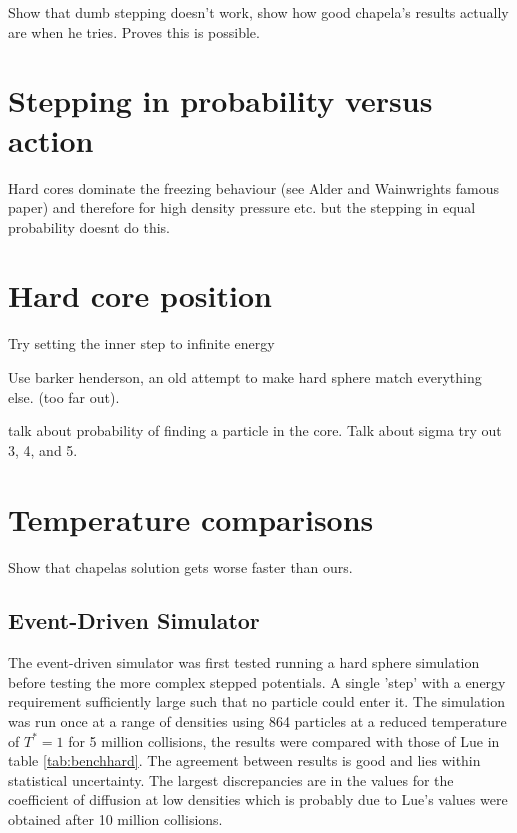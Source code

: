 \documentclass[12pt]{UoAthesis}
\begin{document}
Show that dumb stepping doesn't work, show how good chapela's results actually are when he tries. Proves this is possible.

\section{Stepping in probability versus action}

Hard cores dominate the freezing behaviour (see Alder and Wainwrights
famous paper) and therefore for high density pressure etc. but the stepping in equal probability doesnt do this.

\section{Hard core position}

Try setting the inner step to infinite energy

Use barker henderson, an old attempt to make hard sphere match
everything else. (too far out).


talk about probability of finding a particle in the core. Talk about
sigma try out 3, 4, and 5.

\section{Temperature comparisons}
Show that chapelas solution gets worse faster than ours.

\subsection{Event-Driven Simulator}
 The event-driven simulator was first tested running a hard sphere
 simulation before testing the more complex stepped potentials. A
 single 'step' with a energy requirement sufficiently large such that
 no particle could enter it. The simulation was run once at a range of
 densities using 864 particles at a reduced temperature of $T^*=1$ for
 5 million collisions, the results were compared with those of Lue
 \cite{Lue2005} in table \ref{tab:benchhard}. The agreement between
 results is good and lies within statistical uncertainty. The largest
 discrepancies are in the values for the coefficient of diffusion at
 low densities which is probably due to Lue's values were obtained
 after 10 million collisions.
\end{document}
